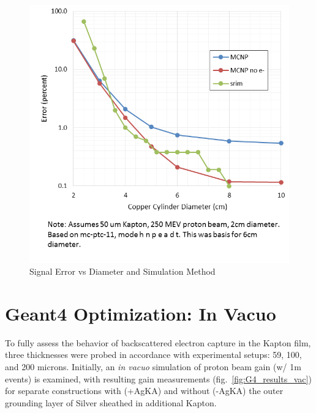 \documentclass{article}
\begin{document}
\begin{figure}[H]
  \centering
  \includegraphics[width=6in]{figures/fig_error_diameter.png}
  \caption{Signal Error vs Diameter and Simulation Method} 
  \label{fig:error_diameter}
\end{figure}

\newpage
\section{Geant4 Optimization: In Vacuo}

To fully assess the behavior of backscattered electron capture in the Kapton film, three thicknesses were probed in accordance with experimental setups: 59, 100, and 200 microns.  Initially, an \emph{in vacuo} simulation of proton beam gain (w/ 1m events) is examined, with resulting gain measurements (fig.~\ref{fig:G4_results_vac}) for separate constructions with (+AgKA) and without (-AgKA) the outer grounding layer of Silver sheathed in additional Kapton.
\end{document}
